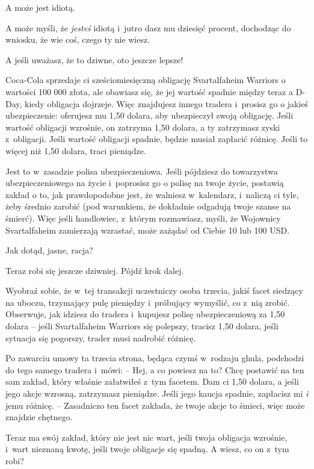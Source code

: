 \documentclass[oneside,polish,11pt,rmheadings]{mwbk}
\begin{document}
A może jest idiotą. 


A może myśli, że \textit{jesteś }idiotą i~jutro dasz mu dziesięć procent, dochodząc do wniosku, że wie coś, czego ty nie wiesz. 


A jeśli uważasz, że to dziwne, oto jeszcze lepsze! 


Coca-Cola sprzedaje ci sześciomiesięczną obligację Svartalfaheim Warriors o wartości 100 000 złota, ale obawiasz się, że jej wartość spadnie między teraz a D-Day, kiedy obligacja dojrzeje. Więc znajdujesz innego tradera i~prosisz go o jakieś ubezpieczenie: oferujesz mu 1,50 dolara, aby ubezpieczył swoją obligację. Jeśli wartość obligacji wzrośnie, on zatrzyma 1,50 dolara, a ty zatrzymasz zyski z~obligacji. Jeśli wartość obligacji spadnie, będzie musiał zapłacić różnicę. Jeśli to więcej niż 1,50 dolara, traci pieniądze. 


Jest to w~zasadzie polisa ubezpieczeniowa. Jeśli pójdziesz do towarzystwa ubezpieczeniowego na życie i~poprosisz go o polisę na twoje życie, postawią zakład o to, jak prawdopodobne jest, że walniesz w~kalendarz, i~naliczą ci tyle, żeby średnio zarobić (pod warunkiem, że dokładnie odgadują twoje szanse na śmierć). Więc jeśli handlowiec, z~którym rozmawiasz, myśli, że Wojownicy Svartalfaheim zamierzają wzrastać, może zażądać od Ciebie 10 lub 100 USD. 


Jak dotąd, jasne, racja? 


Teraz robi się jeszcze dziwniej. Pójdź krok dalej. 


Wyobraź sobie, że w~tej transakcji uczestniczy osoba trzecia, jakiś facet siedzący na uboczu, trzymający pulę pieniędzy i~próbujący wymyślić, co z~nią zrobić. Obserwuje, jak idziesz do tradera i~kupujesz polisę ubezpieczeniową za 1,50 dolara -- jeśli Svartalfaheim Warriors się polepszy, tracisz 1,50 dolara, jeśli sytuacja się pogorszy, trader musi nadrobić różnicę. 


Po zawarciu umowy ta trzecia strona, będąca czymś w~rodzaju ghula, podchodzi do tego samego tradera i~mówi: -- Hej, a co powiesz na to? Chcę postawić na ten sam zakład, który właśnie załatwiłeś z~tym facetem. Dam ci 1,50 dolara, a jeśli jego akcje wzrosną, zatrzymasz pieniądze. Jeśli jego kaucja spadnie, zapłacisz mi \textit{i }jemu różnicę. -- Zasadniczo ten facet zakłada, że twoje akcje to śmieci, więc może znajdzie chętnego. 


Teraz ma swój zakład, który nie jest nic wart, jeśli twoja obligacja wzrośnie, i~wart nieznaną kwotę, jeśli twoje obligacje się spadną. A wiesz, co on z~tym robi? 
\end{document}
